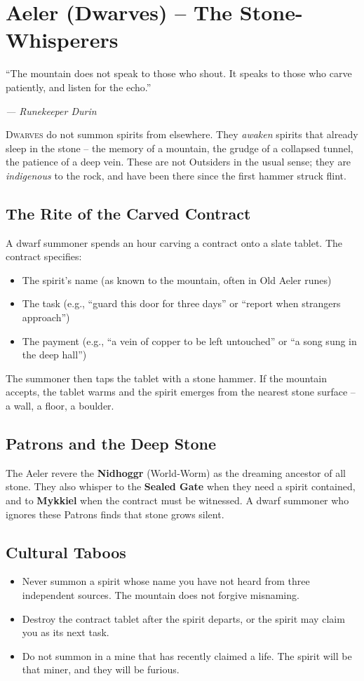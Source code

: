 \documentclass[10pt,a5paper]{book}
\begin{document}
\section{Aeler (Dwarves) – The Stone-Whisperers}
\epigraph{“The mountain does not speak to those who shout. It speaks to those who carve patiently, and listen for the echo.”}{\textit{— Runekeeper Durin}}

\lettrine{D}{warves} do not summon spirits from elsewhere. They \textit{awaken} spirits that already sleep in the stone – the memory of a mountain, the grudge of a collapsed tunnel, the patience of a deep vein. These are not Outsiders in the usual sense; they are \textit{indigenous} to the rock, and have been there since the first hammer struck flint.

\subsection*{The Rite of the Carved Contract}
A dwarf summoner spends an hour carving a contract onto a slate tablet. The contract specifies:
\begin{itemize}
    \item The spirit’s name (as known to the mountain, often in Old Aeler runes)
    \item The task (e.g., “guard this door for three days” or “report when strangers approach”)
    \item The payment (e.g., “a vein of copper to be left untouched” or “a song sung in the deep hall”)
\end{itemize}
The summoner then taps the tablet with a stone hammer. If the mountain accepts, the tablet warms and the spirit emerges from the nearest stone surface – a wall, a floor, a boulder.

\subsection*{Patrons and the Deep Stone}
The Aeler revere the \textbf{Nidhoggr} (World‑Worm) as the dreaming ancestor of all stone. They also whisper to the \textbf{Sealed Gate} when they need a spirit contained, and to \textbf{Mykkiel} when the contract must be witnessed. A dwarf summoner who ignores these Patrons finds that stone grows silent.

\subsection*{Cultural Taboos}
\begin{itemize}
    \item Never summon a spirit whose name you have not heard from three independent sources. The mountain does not forgive misnaming.
    \item Destroy the contract tablet after the spirit departs, or the spirit may claim you as its next task.
    \item Do not summon in a mine that has recently claimed a life. The spirit will be that miner, and they will be furious.
\end{itemize}
\end{document}
